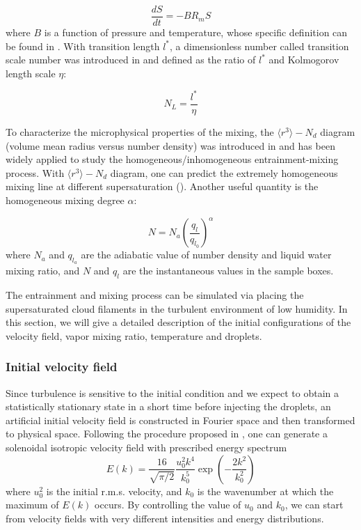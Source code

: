 \documentclass[12pt]{article}
\begin{document}
\begin{equation}
\frac{dS}{dt}=-BR_{m}S\label{eq:DiffSuper}
\end{equation}
where $B$ is a function of pressure and temperature, whose specific definition can be found in \cite{Chunsong11}. With transition length $l^{*}$, a dimensionless number called transition scale number was introduced in \cite{Chunsong13} and defined as the ratio of $l^{*}$ and Kolmogorov length scale $\eta$:

\begin{equation}
N_{L}=\frac{l^{*}}{\eta}\label{eq:NL}
\end{equation}

To characterize the microphysical properties of the mixing, the $\langle r^3\rangle -N_d$ diagram (volume mean radius versus number density) was introduced in \cite{Burnet07} and has been widely applied to study the homogeneous/inhomogeneous entrainment-mixing process. With $\langle r^3\rangle -N_d$ diagram, one can predict the extremely homogeneous mixing line at different supersaturation (\cite{Lehmann09,Kumar14}). Another useful quantity is the homogeneous mixing degree $\alpha$:

\begin{equation}
N=N_{a}(\frac{q_l}{q_{l_0}})^{\alpha}\label{eq:alpha}
\end{equation}
where $N_{a}$ and $q_{l_a}$ are the adiabatic value of number density and liquid water mixing ratio, and $N$ and $q_{l}$ are the instantaneous values in the sample boxes.

The entrainment and mixing process can be simulated via placing the supersaturated cloud filaments in the turbulent environment of low humidity. In this section, we will give a detailed description of the initial configurations of the velocity field, vapor mixing ratio, temperature and droplets. 

\subsubsection{Initial velocity field}

Since turbulence is sensitive to the initial condition and we expect
to obtain a statistically stationary state in a short time before injecting the droplets, an artificial initial velocity field is constructed in Fourier space and then transformed to physical space. Following the procedure proposed in \cite{Rogallo81}, one can generate a solenoidal isotropic velocity field with prescribed energy spectrum \cite{Rosales05}
\begin{equation}
E(k) = \frac{16}{\sqrt{\pi/2}}\frac{u_0^2k^4}{k_0^5}\exp(-\frac{2k^2}{k_0^2})
\end{equation}
where $u_0^2$ is the initial r.m.s. velocity, and $k_0$ is the wavenumber at which the maximum of $E(k)$ occurs. By controlling the value of $u_0$ and $k_0$, we can start from velocity fields with very different intensities and energy distributions.
\end{document}
